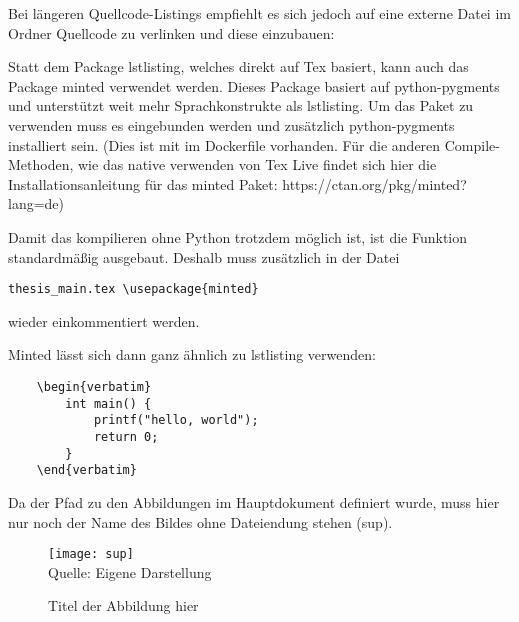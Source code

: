 Bei längeren Quellcode-Listings empfiehlt es sich jedoch auf eine externe Datei im Ordner Quellcode zu verlinken und diese einzubauen:


Statt dem Package lstlisting, welches direkt auf Tex basiert, kann auch das Package minted verwendet werden.
Dieses Package basiert auf python-pygments und unterstützt weit mehr Sprachkonstrukte als lstlisting.
Um das Paket zu verwenden muss es eingebunden werden und zusätzlich python-pygments installiert sein.
(Dies ist mit im Dockerfile vorhanden. Für die anderen Compile-Methoden, wie das native verwenden von Tex Live findet sich hier die Installationsanleitung für das minted Paket: https://ctan.org/pkg/minted?lang=de)

Damit das kompilieren ohne Python trotzdem möglich ist, ist die Funktion standardmäßig ausgebaut. Deshalb muss zusätzlich in der Datei \begin{verbatim}thesis_main.tex \usepackage{minted} \end{verbatim} wieder einkommentiert werden. 

Minted lässt sich dann ganz ähnlich zu lstlisting verwenden:
\begin{lstlisting}
	\begin{verbatim}
		int main() {
			printf("hello, world");
			return 0;
		}
	\end{verbatim}
\end{lstlisting}	

Da der Pfad zu den Abbildungen im Hauptdokument definiert wurde, muss hier nur noch der Name des Bildes ohne Dateiendung stehen (sup).

\begin{figure}[H]
\caption{Titel der Abbildung hier}
\texttt{[image: sup]}
\\
Quelle: Eigene Darstellung
\end{figure}

